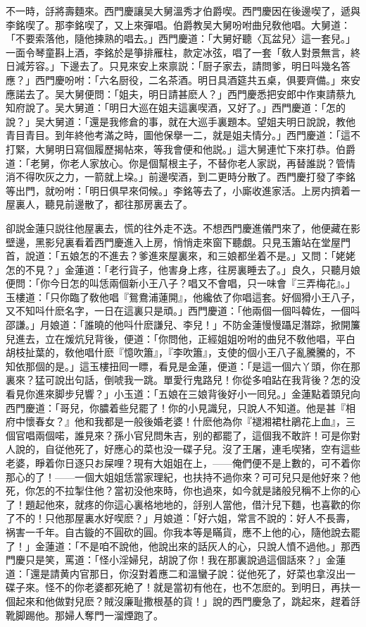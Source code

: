 不一時，㧱將壽麵來。西門慶讓吴大舅溫秀才伯爵喫。西門慶因在後邊喫了，遞與李銘喫了。那李銘喫了，又上來彈唱。伯爵教吴大舅吩咐曲兒敎他唱。大舅道：「不要索落他，隨他揀熟的唱去。」西門慶道：「大舅好聽〈瓦盆兒〉這一套兒。」一面令琴童斟上酒，李銘於是箏排雁柱，款定冰弦，唱了一套「敎人對景無言，終日減芳容。」下邊去了。只見來安上來禀説：「厨子家去，請問爹，明日呌幾名答應？」西門慶吩咐：「六名厨役，二名茶酒。明日具酒筵共五桌，俱要齊備。」來安應諾去了。吴大舅便問：「姐夫，明日請甚麽人？」西門慶悉把安郎中作東請蔡九知府說了。吴大舅道：「明日大巡在姐夫這裏喫酒，又好了。」西門慶道：「怎的說？」吴大舅道：「還是我修倉的事，就在大巡手裏題本。望姐夫明日說說，教他青目青目。到年終他考滿之時，圖他保擧一二，就是姐夫情分。」西門慶道：「這不打緊，大舅明日寫個履歷揭帖來，等我會便和他説。」這大舅連忙下來打恭。伯爵道：「老舅，你老人家放心。你是個幫根主子，不替你老人家説，再替誰説？管情消不得吹灰之力，一箭就上垜。」前邊喫酒，到二更時分散了。西門慶打發了李銘等出門，就吩咐：「明日俱早來伺候。」李銘等去了，小廝收進家活。上房内擠着一屋裏人，聽見前邊散了，都往那房裏去了。

卻説金蓮只説往他屋裏去，慌的往外走不迭。不想西門慶進儀門來了，他便藏在影壁邊，黑影兒裏看着西門慶進入上房，悄悄走來窗下聽覷。只見玉簫站在堂屋門首，說道：「五娘怎的不進去？爹進來屋裏來，和三娘都坐着不是。」又問：「姥姥怎的不見？」金蓮道：「老行貨子，他害身上疼，往房裏睡去了。」良久，只聽月娘便問：「你今日怎的叫恁兩個新小王八子？唱又不會唱，只一味會『三弄梅花』。」玉樓道：「只你臨了敎他唱『鴛鴦浦蓮開』，他纔依了你唱這套。好個猾小王八子，又不知呌什麽名字，一日在這裏只是頑。」西門慶道：「他兩個一個呌韓佐，一個呌邵謙。」月娘道：「誰曉的他呌什麽謙兒、李兒！」不防金蓮慢慢躡足潛踪，掀開簾兒進去，立在煖炕兒背後，便道：「你問他，正經姐姐吩咐的曲兒不敎他唱，平白胡枝扯葉的，敎他唱什麽『憶吹簫』，『李吹簫』，支使的個小王八子亂騰騰的，不知依那個的是。」這玉樓扭囘一瞟，看見是金蓮，便道：「是這一個六丫頭，你在那裏來？猛可說出句話，倒唬我一跳。單愛行鬼路兒！你從多咱跕在我背後？怎的没看見你進來脚步兒響？」小玉道：「五娘在三娘背後好小一囘兒。」金蓮點着頭兒向西門慶道：「哥兒，你膿着些兒罷了！你的小見識兒，只說人不知道。他是甚『相府中懷春女？』他和我都是一般後婚老婆！什麽他為你『褪湘裙杜鵑花上血』，三個官唱兩個喏，誰見來？孫小官兒問朱吉，别的都罷了，這個我不敢許！可是你對人說的，自従他死了，好應心的菜也没一碟子兒。沒了王屠，連毛喫猪，空有這些老婆，睜着你日逐只お屎哩？現有大姐姐在上，——俺們便不是上數的，可不着你那心的了！——一個大姐姐恁當家理紀，也扶持不過你來？可可兒只是他好來？他死，你怎的不拉掣住他？當初没他來時，你也過來，如今就是諸般兒稱不上你的心了！題起他來，就疼的你這心裏格地地的，㧱别人當他，借汁兒下麵，也喜歡的你了不的！只他那屋裏水好喫麽？」月娘道：「好六姐，常言不說的：好人不長壽，祸害一千年。自古鏇的不圓砍的圓。你我本等是瞞貨，應不上他的心，隨他說去罷了！」金蓮道：「不是咱不說他，他說出來的話灰人的心，只說人憤不過他。」那西門慶只是笑，罵道：「怪小淫婦兒，胡說了你！我在那裏說過這個話來？」金蓮道：「還是請黄内官那日，你沒對着應二和溫蠻子說：従他死了，好菜也拿沒出一碟子來。怪不的你老婆都死絶了！就是當初有他在，也不怎麽的。到明日，再扶一個起來和他做對兒麽？賊沒廉耻撒根基的貨！」說的西門慶急了，跳起來，趕着㧱靴脚踢他。那婦人奪門一溜煙跑了。

